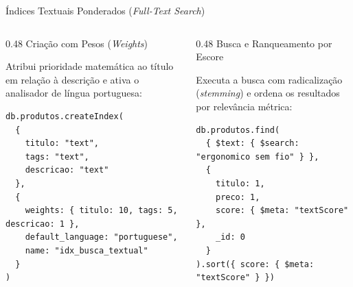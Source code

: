 \begin{frame}[fragile]{Índices Textuais Ponderados (\textit{Full-Text Search})}
  \vspace{0.05cm}
  \begin{columns}[t,onlytextwidth]
    \begin{column}{0.48\textwidth}
      \alert{Criação com Pesos (\textit{Weights})}\par
      \scriptsize
      Atribui prioridade matemática ao título em relação à descrição e ativa o analisador de língua portuguesa:
      \begin{lstlisting}[language=mongosh]
db.produtos.createIndex(
  {
    titulo: "text",
    tags: "text",
    descricao: "text"
  },
  {
    weights: { titulo: 10, tags: 5, descricao: 1 },
    default_language: "portuguese",
    name: "idx_busca_textual"
  }
)
      \end{lstlisting}
    \end{column}
    \begin{column}{0.48\textwidth}
      \alert{Busca e Ranqueamento por Escore}\par
      \scriptsize
      Executa a busca com radicalização (\textit{stemming}) e ordena os resultados por relevância métrica:
      \begin{lstlisting}[language=mongosh]
db.produtos.find(
  { $text: { $search: "ergonomico sem fio" } },
  {
    titulo: 1,
    preco: 1,
    score: { $meta: "textScore" },
    _id: 0
  }
).sort({ score: { $meta: "textScore" } })
      \end{lstlisting}
    \end{column}
  \end{columns}
\end{frame}

